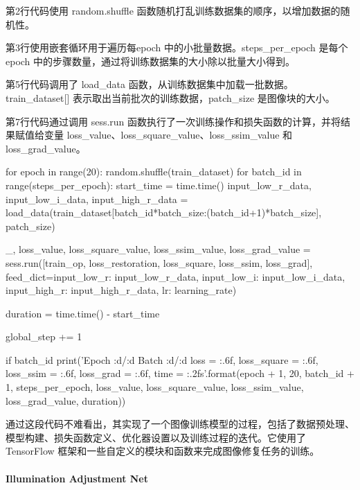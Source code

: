 \documentclass[letterpaper,12pt]{article}
\begin{document}
				第2行代码使用 random.shuffle 函数随机打乱训练数据集的顺序，以增加数据的随机性。
				
				第3行使用嵌套循环用于遍历每epoch 中的小批量数据。steps\_per\_epoch 是每个 epoch 中的步骤数量，通过将训练数据集的大小除以批量大小得到。
				
				第5行代码调用了 load\_data 函数，从训练数据集中加载一批数据。train\_dataset[] 表示取出当前批次的训练数据，patch\_size 是图像块的大小。

				第7行代码通过调用 sess.run 函数执行了一次训练操作和损失函数的计算，并将结果赋值给变量 loss\_value、loss\_square\_value、loss\_ssim\_value 和 loss\_grad\_value。
				
				\begin{python}
				for epoch in range(20):
					random.shuffle(train_dataset)
				for batch_id in range(steps_per_epoch):
					start_time = time.time()					
					input_low_r_data, input_low_i_data, input_high_r_data = load_data(train_dataset[batch_id*batch_size:(batch_id+1)*batch_size], patch_size)
					
					_, loss_value, loss_square_value, loss_ssim_value, loss_grad_value = sess.run([train_op, loss_restoration, loss_square, loss_ssim, loss_grad], feed_dict={input_low_r: input_low_r_data, input_low_i: input_low_i_data, input_high_r: input_high_r_data, lr: learning_rate})
					
					duration = time.time() - start_time
					
					global_step += 1
					
					if batch_id %
						print('Epoch {:d}/{:d} Batch {:d}/{:d} loss = {:.6f}, loss_square = {:.6f}, loss_ssim = {:.6f}, loss_grad = {:.6f}, time = {:.2f}s'.format(epoch + 1, 20, batch_id + 1, steps_per_epoch, loss_value, loss_square_value, loss_ssim_value, loss_grad_value, duration))
				\end{python}
				
				通过这段代码不难看出，其实现了一个图像训练模型的过程，包括了数据预处理、模型构建、损失函数定义、优化器设置以及训练过程的迭代。它使用了 TensorFlow 框架和一些自定义的模块和函数来完成图像修复任务的训练。
				
				
			\paragraph{Illumination Adjustment Net}
		
\end{document}

